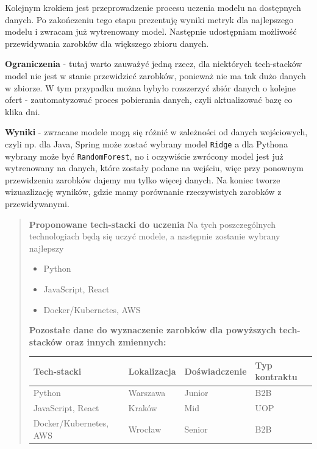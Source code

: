 \documentclass[a4paper]{article}
\begin{document}
\quad Kolejnym krokiem jest przeprowadzenie procesu uczenia modelu na dostępnych
danych. Po zakończeniu tego etapu prezentuję wyniki metryk dla najlepszego modelu i zwracam już
wytrenowany model. Następnie udostępniam możliwość przewidywania zarobków dla większego zbioru danych.

\textbf{Ograniczenia} - tutaj warto zauważyć jedną rzecz, dla niektórych tech-stacków model nie jest w stanie
przewidzieć zarobków, ponieważ nie ma tak dużo danych w zbiorze. W tym przypadku można bybyło rozszerzyć zbiór
danych o kolejne ofert - zautomatyzować proces pobierania danych, czyli aktualizować bazę co klika dni.

\textbf{Wyniki} - zwracane modele mogą się różnić w zależności od danych wejściowych, czyli np.
dla Java, Spring może zostać wybrany model \texttt{Ridge} a dla Pythona wybrany może być \texttt{RandomForest}, no i oczywiście zwrócony
model jest już wytrenowany na danych, które zostały podane na wejściu, więc przy ponownym przewidzeniu zarobków dajemy
mu tylko więcej danych. Na koniec tworze wizuazlizację wyników, gdzie mamy porównanie rzeczywistych zarobków z przewidywanymi.

\begin{abstract}
    \textbf{Proponowane tech-stacki do uczenia}
    \quad Na tych poszczególnych technologiach będą się uczyć modele, a następnie zostanie wybrany najlepszy
    \begin{itemize}
        \item Python
        \item JavaScript, React
        \item Docker/Kubernetes, AWS
    \end{itemize}

    \textbf{Pozostałe dane do wyznaczenie zarobków dla powyższych tech-stacków oraz innych zmiennych:}
    \begin{table}[H]
        \centering
        \begin{tabular}{|l|l|l|l|}
            \hline
            \textbf{Tech-stacki}   & \textbf{Lokalizacja} & \textbf{Doświadczenie} & \textbf{Typ kontraktu} \\ \hline
            Python                 & Warszawa             & Junior                 & B2B                    \\ \hline
            JavaScript, React      & Kraków               & Mid                    & UOP                    \\ \hline
            Docker/Kubernetes, AWS & Wrocław              & Senior                 & B2B                    \\ \hline
        \end{tabular}
    \end{table}

\end{abstract}
\end{document}

